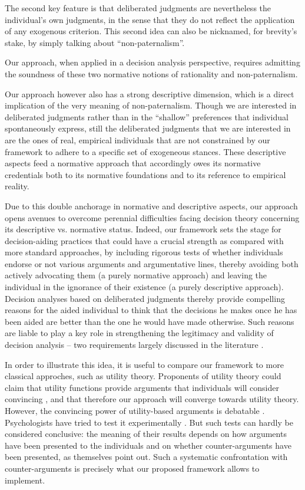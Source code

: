 \documentclass[version=3.21, pagesize, twoside=off, bibliography=totoc, DIV=calc, fontsize=12pt, a4paper]{scrartcl}
\begin{document}
	The second key feature is that deliberated judgments are nevertheless the individual's own judgments, in the sense that they do not reflect the application of any exogenous criterion. This second idea can also be nicknamed, for brevity's stake, by simply talking about “non-paternalism”.

Our approach, when applied in a decision analysis perspective, requires admitting the soundness of these two normative notions of rationality and non-paternalism.


Our approach however also has a strong descriptive dimension, which is a direct implication of the very meaning of non-paternalism. Though we are interested in deliberated judgments rather than in the ``shallow'' preferences that individual spontaneously express, still the deliberated judgments that we are interested in are the ones of real, empirical individuals that are not constrained by our framework to adhere to a specific set of exogeneous stances. These descriptive aspects feed a normative approach that accordingly owes its normative credentials both to its normative foundations and to its reference to empirical reality.

Due to this double anchorage in normative and descriptive aspects, our approach opens avenues to overcome perennial difficulties facing decision theory concerning its descriptive vs. normative status. Indeed, our framework sets the stage for decision-aiding practices that could have a crucial strength as compared with more standard approaches, by including rigorous tests of whether individuals endorse or not various arguments and argumentative lines, thereby avoiding both actively advocating them (a purely normative approach) and leaving the individual in the ignorance of their existence (a purely descriptive approach). Decision analyses based on deliberated judgments thereby provide compelling reasons for the aided individual to think that the decisions he makes once he has been aided are better than the one he would have made otherwise. Such reasons are liable to play a key role in strengthening the legitimacy and validity of decision analysis -- two requirements largely discussed in the literature \citep{landry_model_1983, landry_model_1996}.

In order to illustrate this idea, it is useful to compare our framework to more classical approches, such as utility theory. Proponents of utility theory could claim that utility functions provide arguments that individuals will consider convincing \citep{savage_foundations_1972, morgenstern_reflections_1979, raiffa_back_1985}, and that therefore our approach will converge towards utility theory. However, the convincing power of utility-based arguments is debatable \citep{ellsberg_risk_1961, allais_so-called_1979}. Psychologists have tried to test it experimentally \citep{slovic_who_1974, maccrimmon_utility_1979}. But such tests can hardly be considered conclusive: the meaning of their results depends on how arguments have been presented to the individuals and on whether counter-arguments have been presented, as \citet{slovic_who_1974} themselves point out. Such a systematic confrontation with counter-arguments is precisely what our proposed framework allows to implement. 
\end{document}
